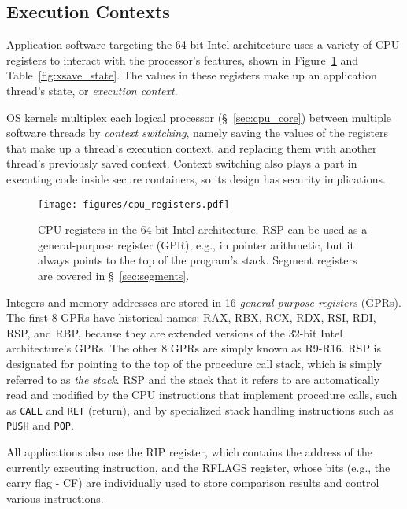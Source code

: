 \subsection{Execution Contexts}
\label{sec:registers}

Application software targeting the 64-bit Intel architecture uses a variety of
CPU registers to interact with the processor's features, shown in
Figure~\ref{fig:cpu_registers} and Table~\ref{fig:xsave_state}. The values in
these registers make up an application thread's state, or \textit{execution
context}.

OS kernels multiplex each logical processor (\S~\ref{sec:cpu_core}) between
multiple software threads by \textit{context switching}, namely saving the
values of the registers that make up a thread's execution context, and
replacing them with another thread's previously saved context. Context
switching also plays a part in executing code inside secure containers, so its
design has security implications.


\begin{figure}[hbt]
  \centering
  \texttt{[image: figures/cpu\_registers.pdf]}
  \caption{
    CPU registers in the 64-bit Intel architecture. RSP can be used as a
    general-purpose register (GPR), e.g., in pointer arithmetic, but it always
    points to the top of the program's stack. Segment registers are covered in
    \S~\ref{sec:segments}.
  }
  \label{fig:cpu_registers}
\end{figure}

Integers and memory addresses are stored in 16 \textit{general-purpose
registers} (GPRs). The first 8 GPRs have historical names: RAX, RBX, RCX,
RDX, RSI, RDI, RSP, and RBP, because they are extended versions of the 32-bit
Intel architecture's GPRs. The other 8 GPRs are simply known as R9-R16. RSP is
designated for pointing to the top of the procedure call stack, which is simply
referred to as \textit{the stack}. RSP and the stack that it refers to are
automatically read and modified by the CPU instructions that implement
procedure calls, such as \texttt{CALL} and \texttt{RET} (return), and by
specialized stack handling instructions such as \texttt{PUSH} and \texttt{POP}.

All applications also use the RIP register, which contains the address of the
currently executing instruction, and the RFLAGS register, whose bits (e.g.,
the carry flag - CF) are individually used to store comparison results and
control various instructions.

